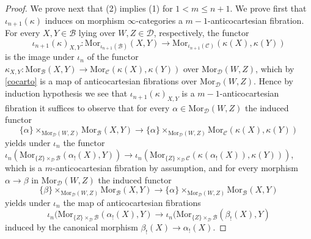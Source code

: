 \documentclass[10pt,oneside]{article}
\numberwithin{equation}{section} %
\numberwithin{figure}{section} %
\theoremstyle{plain}
\theoremstyle{definition}
\newcommand{\mB}{{\mathcal B}}
\newcommand{\mC}{{\mathcal C}}
\newcommand{\mD}{{\mathcal D}}
\newcommand{\Mor}{{\mathrm{Mor}}}
\begin{document}
\begin{proof}
We prove next that (2) implies (1) for $1 < m \leq n+1.$ 
We prove first that $\iota_{n+1}(\kappa)$ induces on morphism
$\infty$-categories a $m-1$-anticocartesian fibration.
For every $X,Y \in \mB$ lying over $W,Z \in \mD$, respectively,
the functor $$\iota_{n+1}(\kappa)_{X,Y}: \Mor_{\iota_{n+1}(\mB)}(X,Y) \to \Mor_{\iota_{n+1}(\mC)}(\kappa(X),\kappa(Y)) $$
is the image under $\iota_n$ of the functor
$\kappa_{X,Y}: \Mor_\mB(X,Y) \to \Mor_\mC(\kappa(X),\kappa(Y))$
over $\Mor_\mD(W, Z)$, which by \cref{cocarto} is a map of anticocartesian fibrations over $\Mor_\mD(W, Z).$
Hence by induction hypothesis we see that $\iota_{n+1}(\kappa)_{X,Y}$ is a $m-1$-anticocartesian fibration it suffices to observe that for every $\alpha \in \Mor_\mD(W, Z)$ the induced functor 
$$\{\alpha\} \times_{\Mor_\mD(W, Z)} \Mor_\mB(X,Y) \to \{\alpha\} \times_{\Mor_\mD(W, Z)} \Mor_\mC(\kappa(X),\kappa(Y))$$
yields under $\iota_n$ the functor  
$ \iota_n(\Mor_{\{Z\} \times_\mD \mB}(\alpha_!(X),Y)) \to \iota_n(\Mor_{\{Z\} \times_\mD \mC}(\kappa(\alpha_!(X)),\kappa(Y)))$, which is a $m$-anticocartesian fibration by assumption,
and for every morphism $\alpha \to \beta$ in $\Mor_\mD(W, Z)$
the induced functor
$$\{\beta\} \times_{\Mor_\mD(W, Z)} \Mor_\mB(X,Y) \to \{\alpha\} \times_{\Mor_\mD(W, Z)} \Mor_\mB(X,Y)$$
yields under $\iota_n$ the map of anticocartesian fibrations
$$ \iota_n(\Mor_{\{Z\} \times_\mD \mB}(\alpha_!(X),Y) \to \iota_n(\Mor_{\{Z\} \times_\mD \mB}(\beta_!(X),Y) $$ induced by the canonical morphism
$\beta_!(X) \to \alpha_!(X).$


\end{proof}
\end{document}
